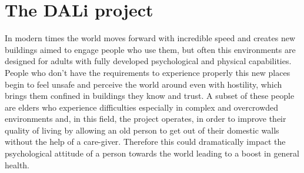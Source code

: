 \chapter{The DALi project}

In modern times the world moves forward with incredible speed and creates new buildings aimed to engage people who use them, but often this environments are designed for adults with fully developed psychological and physical capabilities.
People who don't have the requirements to experience properly this new places begin to feel unsafe and perceive the world around even with hostility, which brings them confined in buildings they know and trust.
A subset of these people are elders who experience difficulties especially in complex and overcrowded environments and, in this field, the project operates, in order to improve their quality of living by allowing an old person to get out of their domestic walls without the help of a care-giver.
Therefore this could dramatically impact the psychological attitude of a person towards the world leading to a boost in general health.
  
